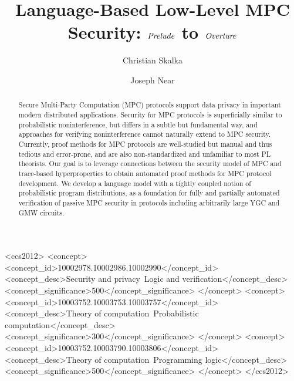 \documentclass[sigconf]{acmart}
\begin{document}
\title{Language-Based Low-Level MPC Security: $\mathit{Prelude}$ to $\mathit{Overture}$}

\author{Christian Skalka}

\author{Joseph Near}

\begin{abstract}
Secure Multi-Party Computation (MPC) protocols support data privacy in
important modern distributed applications. Security for MPC protocols
is superficially similar to probabilistic noninterference, but differs
in a subtle but fundamental way, and approaches for verifying
noninterference cannot naturally extend to MPC security.  Currently,
proof methods for MPC protocols are well-studied but manual and thus
tedious and error-prone, and are also non-standardized and unfamiliar
to most PL theorists.  Our goal is to leverage connections between the
security model of MPC and trace-based hyperproperties to obtain
automated proof methods for MPC protocol development.  We develop a
language model with a tightly coupled notion of probabilistic program
distributions, as a foundation for fully and partially automated
verification of passive MPC security in protocols including
arbitrarily large YGC and GMW circuits.
\end{abstract}

\begin{CCSXML}
<ccs2012>
   <concept>
       <concept_id>10002978.10002986.10002990</concept_id>
       <concept_desc>Security and privacy~Logic and verification</concept_desc>
       <concept_significance>500</concept_significance>
       </concept>
   <concept>
       <concept_id>10003752.10003753.10003757</concept_id>
       <concept_desc>Theory of computation~Probabilistic computation</concept_desc>
       <concept_significance>300</concept_significance>
       </concept>
   <concept>
       <concept_id>10003752.10003790.10003806</concept_id>
       <concept_desc>Theory of computation~Programming logic</concept_desc>
       <concept_significance>500</concept_significance>
       </concept>
 </ccs2012>
\end{CCSXML}

\end{document}
